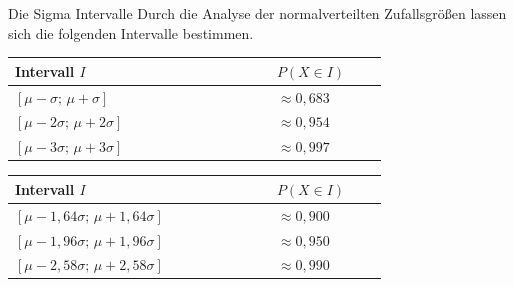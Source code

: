 \begin{merke}{Die Sigma Intervalle}{}
Durch die Analyse der normalverteilten Zufallsgrößen lassen sich die folgenden Intervalle bestimmen. 

\begin{center}
\renewcommand{\arraystretch}{1.25}
\setlength{\tabcolsep}{7pt}

\begin{tabular}{|>{\raggedright\arraybackslash}p{0.52\linewidth}|>{\raggedright\arraybackslash}p{0.22\linewidth}|}
\hline
\rowcolor{headbg}\textbf{Intervall \(I\)} & \textbf{\(P(X\in I)\)}\\ \hline
\([\mu-\sigma;\,\mu+\sigma]\)   & \(\approx 0{,}683\)\\ \hline
\([\mu-2\sigma;\,\mu+2\sigma]\) & \(\approx 0{,}954\)\\ \hline
\([\mu-3\sigma;\,\mu+3\sigma]\) & \(\approx 0{,}997\)\\ \hline
\end{tabular}

\vspace{10pt}

\begin{tabular}{|>{\raggedright\arraybackslash}p{0.52\linewidth}|>{\raggedright\arraybackslash}p{0.22\linewidth}|}
\hline
\rowcolor{headbg}\textbf{Intervall \(I\)} & \textbf{\(P(X\in I)\)}\\ \hline
\([\mu-1{,}64\sigma;\,\mu+1{,}64\sigma]\) & \(\approx 0{,}900\)\\ \hline
\([\mu-1{,}96\sigma;\,\mu+1{,}96\sigma]\) & \(\approx 0{,}950\)\\ \hline
\([\mu-2{,}58\sigma;\,\mu+2{,}58\sigma]\) & \(\approx 0{,}990\)\\ \hline
\end{tabular}
\end{center}

\vspace{14pt}

\begin{center}
\end{center}
\end{merke}
